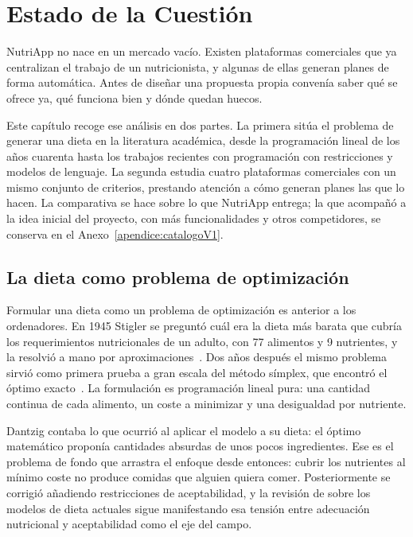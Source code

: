 \chapter{Estado de la Cuestión}
\label{cap:estadoDeLaCuestion}

NutriApp no nace en un mercado vacío. Existen plataformas comerciales que ya centralizan el trabajo de un nutricionista, y algunas de ellas generan planes de forma automática. Antes de diseñar una propuesta propia convenía saber qué se ofrece ya, qué funciona bien y dónde quedan huecos.

Este capítulo recoge ese análisis en dos partes. La primera sitúa el problema de generar una dieta en la literatura académica, desde la programación lineal de los años cuarenta hasta los trabajos recientes con programación con restricciones y modelos de lenguaje. La segunda estudia cuatro plataformas comerciales con un mismo conjunto de criterios, prestando atención a cómo generan planes las que lo hacen. La comparativa se hace sobre lo que NutriApp entrega; la que acompañó a la idea inicial del proyecto, con más funcionalidades y otros competidores, se conserva en el Anexo~\ref{apendice:catalogoV1}.

\section{La dieta como problema de optimización}
\label{sec:literaturaDieta}

Formular una dieta como un problema de optimización es anterior a los ordenadores. En 1945 Stigler se preguntó cuál era la dieta más barata que cubría los requerimientos nutricionales de un adulto, con 77 alimentos y 9 nutrientes, y la resolvió a mano por aproximaciones~\citep{stigler1945}. Dos años después el mismo problema sirvió como primera prueba a gran escala del método símplex, que encontró el óptimo exacto~\citep{dantzig1990}. La formulación es programación lineal pura: una cantidad continua de cada alimento, un coste a minimizar y una desigualdad por nutriente.

Dantzig contaba lo que ocurrió al aplicar el modelo a su dieta: el óptimo matemático proponía cantidades absurdas de unos pocos ingredientes. Ese es el problema de fondo que arrastra el enfoque desde entonces: cubrir los nutrientes al mínimo coste no produce comidas que alguien quiera comer. Posteriormente se corrigió añadiendo restricciones de aceptabilidad, y la revisión de \citet{gazan2018} sobre los modelos de dieta actuales sigue manifestando esa tensión entre adecuación nutricional y aceptabilidad como el eje del campo.

